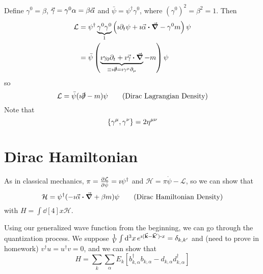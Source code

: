 \documentclass[a4paper,twoside,master.tex]{subfiles}
\begin{document}
Define $ \gamma^0 = \beta $, $ \va{\gamma} = \gamma^0 \alpha = \beta \va{\alpha} $ and $ \bar{\psi} = \psi^\dagger \gamma^0 $, where $ (\gamma^0)^2 = \beta^2 = 1 $. Then
\begin{align}
    \mathcal{L} &= \psi^\dagger \underbrace{\gamma^0 \gamma^0}_{1} \left( \imath \partial_t \psi + \imath \va{\alpha} \vdot \grad - \gamma^0 m \right) \psi \\
                &= \bar{\psi} \left( \underbrace{\imath \gamma_0 \partial_t + \imath \va{\gamma} \vdot \grad}_{\equiv \imath \slashed{\partial} = \imath \gamma^{\mu} \partial_{\mu}} - m \right) \psi
\end{align}
so
\begin{equation}
    \mathcal{L} = \bar{\psi} (\imath \slashed{\partial} - m) \psi \tag{Dirac Lagrangian Density}
\end{equation}
Note that
\begin{equation}
    \pb{\gamma^{\mu}}{\gamma^{\nu}} = 2 \eta^{\mu \nu}
\end{equation}

\section{Dirac Hamiltonian}\label{sec:dirac_hamiltonian}

As in classical mechanics, $ \pi = \pdv{\mathcal{L}}{\dot{\psi}} = \imath \psi^\dagger $ and $ \mathcal{H} = \pi \dot{\psi} - \mathcal{L} $, so we can show that
\begin{equation}
    \mathcal{H} = \psi^\dagger (- \imath \va{\alpha} \vdot \grad + \beta m) \psi \tag{Dirac Hamiltonian Density}
\end{equation}
with $ H = \int \dd[4]{x} \mathcal{H} $.

Using our generalized wave function from the beginning, we can go through the quantization process. We suppose $ \frac{1}{V} \int \dd[3]{x}e^{\imath (\va{k} - \va{k}') \vdot x} = \delta_{k, k'} $ and (need to prove in homework) $ v^\dagger u = u^\dagger v = 0 $, and we can show that
\begin{equation}
    H = \sum_k \sum_{\alpha} E_k \left[ b^\dagger_{k, \alpha} b_{k, \alpha} - d_{k, \alpha} d^\dagger_{k, \alpha} \right]
\end{equation}
\end{document}
